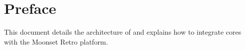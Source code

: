 \part*{Preface}

This document details the architecture of and explains how to integrate cores with the Moonset Retro platform.